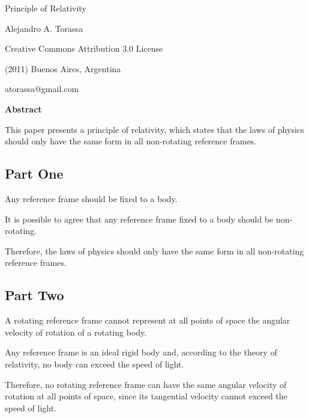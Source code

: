 \documentclass[10pt]{article}
\begin{document}
\begin{center}

{\LARGE Principle of Relativity}

\bigskip \medskip

{\large Alejandro A. Torassa}

\bigskip \medskip

\footnotesize

Creative Commons Attribution 3.0 License

(2011) Buenos Aires, Argentina

atorassa@gmail.com

\bigskip \smallskip

\small

{\bf Abstract}

\bigskip

\parbox{75mm}{This paper presents a principle of relativity, which states that the laws of physics should only have the same form in all non-rotating reference frames.}

\end{center}

\normalsize

\vspace{-0.60em}

{\centering\subsection*{Part One}}

\par Any reference frame should be fixed to a body.
\medskip
\par It is possible to agree that any reference frame fixed to a body should be non-rotating.
\medskip
\par Therefore, the laws of physics should only have the same form in all non-rotating reference frames.

\vspace{+0.99em}

{\centering\subsection*{Part Two}}

\par A rotating reference frame cannot represent at all points of space the angular velocity of rotation of a rotating body.
\medskip
\par Any reference frame is an ideal rigid body and, according to the theory of relativity, no body can exceed the speed of light.
\medskip
\par Therefore, no rotating reference frame can have the same angular velocity of rotation at all points of space, since its tangential velocity cannot exceed the speed of light.
\end{document}
